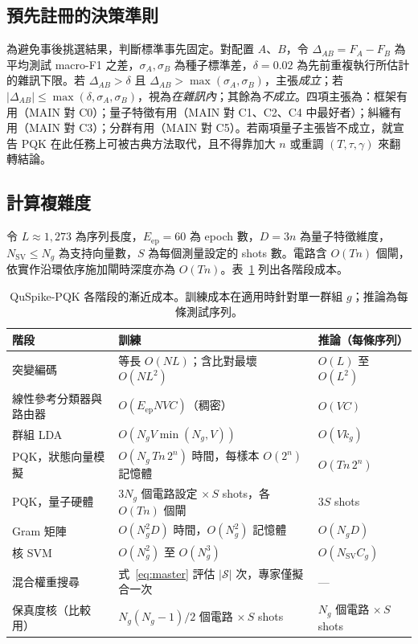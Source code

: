\documentclass[10pt,a4paper]{article}
\begin{document}
\subsection{預先註冊的決策準則}
\label{sec:criteria}

為避免事後挑選結果，判斷標準事先固定。對配置 $A$、$B$，令 $\Delta_{AB}=F_A-F_B$ 為平均測試 macro-F1 之差，$\sigma_A,\sigma_B$ 為種子標準差，$\delta=0.02$ 為先前重複執行所估計的雜訊下限。若 $\Delta_{AB}>\delta$ 且 $\Delta_{AB}>\max(\sigma_A,\sigma_B)$，主張\emph{成立}；若 $|\Delta_{AB}|\le\max(\delta,\sigma_A,\sigma_B)$，視為\emph{在雜訊內}；其餘為\emph{不成立}。四項主張為：框架有用（MAIN 對 C0）；量子特徵有用（MAIN 對 C1、C2、C4 中最好者）；糾纏有用（MAIN 對 C3）；分群有用（MAIN 對 C5）。若兩項量子主張皆不成立，就宣告 PQK 在此任務上可被古典方法取代，且不得靠加大 $n$ 或重調 $(T,\tau,\gamma)$ 來翻轉結論。

\subsection{計算複雜度}
\label{sec:complexity}

令 $L\approx1{,}273$ 為序列長度，$E_{\mathrm{ep}}=60$ 為 epoch 數，$D=3n$ 為量子特徵維度，$N_{\mathrm{SV}}\le N_g$ 為支持向量數，$S$ 為每個測量設定的 shots 數。電路含 $O(Tn)$ 個閘，依實作沿環依序施加閘時深度亦為 $O(Tn)$。表~\ref{tab:complexity} 列出各階段成本。

\begin{table}[!ht]
    \centering
    \caption{QuSpike-PQK 各階段的漸近成本。訓練成本在適用時針對單一群組 $g$；推論為每條測試序列。}
    \label{tab:complexity}
    \small
    \setlength{\tabcolsep}{5pt}
    \renewcommand{\arraystretch}{1.2}
    \begin{tabular*}{\textwidth}{@{\extracolsep{\fill}}lll@{}}
        \toprule
        階段 & 訓練 & 推論（每條序列） \\
        \midrule
        突變編碼 & 等長 $O(NL)$；含比對最壞 $O(NL^2)$ & $O(L)$ 至 $O(L^2)$ \\
        線性參考分類器與路由器 & $O(E_{\mathrm{ep}}NVC)$（稠密） & $O(VC)$ \\
        群組 LDA & $O(N_gV\min(N_g,V))$ & $O(Vk_g)$ \\
        PQK，狀態向量模擬 & $O(N_g\,Tn\,2^{n})$ 時間，每樣本 $O(2^n)$ 記憶體 & $O(Tn\,2^{n})$ \\
        PQK，量子硬體 & $3N_g$ 個電路設定 $\times\,S$ shots，各 $O(Tn)$ 個閘 & $3S$ shots \\
        Gram 矩陣 & $O(N_g^2D)$ 時間，$O(N_g^2)$ 記憶體 & $O(N_gD)$ \\
        核 SVM & $O(N_g^2)$ 至 $O(N_g^3)$ & $O(N_{\mathrm{SV}}C_g)$ \\
        混合權重搜尋 & 式~\eqref{eq:master} 評估 $|\mathcal{S}|$ 次，專家僅擬合一次 & --- \\
        \midrule
        保真度核（比較用） & $N_g(N_g-1)/2$ 個電路 $\times\,S$ shots & $N_g$ 個電路 $\times\,S$ shots \\
        \bottomrule
    \end{tabular*}
\end{table}
\end{document}
